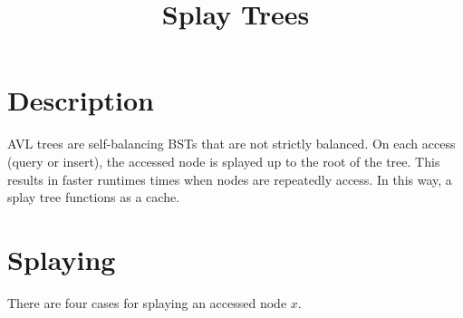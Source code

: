 \documentclass[12pt]{article}
\begin{document}
\title{Splay Trees}
\author{}
\maketitle

\section*{Description}
AVL trees are self-balancing BSTs that are not strictly balanced. On each access (query or insert), the accessed node is splayed up to the root of the tree. This results in faster runtimes times when nodes are repeatedly access. In this way, a splay tree functions as a cache.

\section*{Splaying}
There are four cases for splaying an accessed node $x$.
\end{document}
